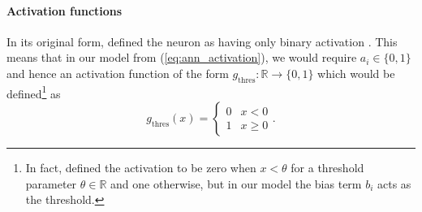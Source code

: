 \paragraph{Activation functions}
In its original form, \citeauthor{mcculloch1943} defined the neuron as having only binary activation \cite{mcculloch1943}. 
This means that in our model from (\ref{eq:ann_activation}), we would require $a_i \in \{0, 1\}$ and hence an activation function of the form $g_\text{thres}: \mathbb{R} \rightarrow \{0, 1\}$ which would be defined\footnote{In fact, \citeauthor{mcculloch1943} defined the activation to be zero when $x<\theta$ for a threshold parameter $\theta \in \mathbb{R}$ and one otherwise, but in our model the bias term $b_i$ acts as the threshold.} as
\begin{equation}
    \label{eq:thres_activation}
    g_\text{thres}(x) = \begin{cases} 
        0 & x < 0 \\
        1 & x \geq 0
    \end{cases}.
\end{equation}

